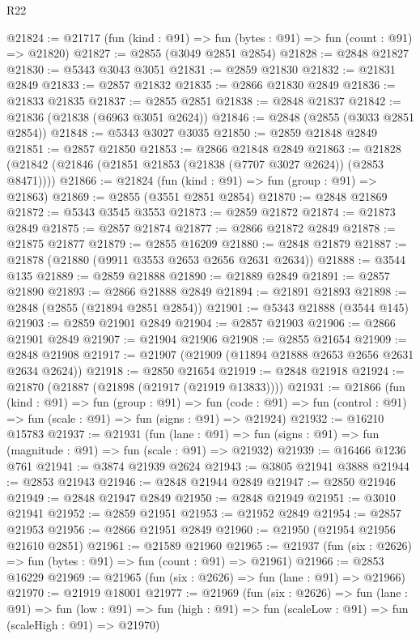 \begin{lexlean}{R22}
\begin{coremodule}
@21824 := @21717 (fun (kind : @91) => fun (bytes : @91) => fun (count : @91) => @21820)
@21827 := @2855 (@3049 @2851 @2854)
@21828 := @2848 @21827
@21830 := @5343 @3043 @3051
@21831 := @2859 @21830
@21832 := @21831 @2849
@21833 := @2857 @21832
@21835 := @2866 @21830 @2849
@21836 := @21833 @21835
@21837 := @2855 @2851
@21838 := @2848 @21837
@21842 := @21836 (@21838 (@6963 @3051 @2624))
@21846 := @2848 (@2855 (@3033 @2851 @2854))
@21848 := @5343 @3027 @3035
@21850 := @2859 @21848 @2849
@21851 := @2857 @21850
@21853 := @2866 @21848 @2849
@21863 := @21828 (@21842 (@21846 (@21851 @21853 (@21838 (@7707 @3027 @2624)) (@2853 @8471))))
@21866 := @21824 (fun (kind : @91) => fun (group : @91) => @21863)
@21869 := @2855 (@3551 @2851 @2854)
@21870 := @2848 @21869
@21872 := @5343 @3545 @3553
@21873 := @2859 @21872
@21874 := @21873 @2849
@21875 := @2857 @21874
@21877 := @2866 @21872 @2849
@21878 := @21875 @21877
@21879 := @2855 @16209
@21880 := @2848 @21879
@21887 := @21878 (@21880 (@9911 @3553 @2653 @2656 @2631 @2634))
@21888 := @3544 @135
@21889 := @2859 @21888
@21890 := @21889 @2849
@21891 := @2857 @21890
@21893 := @2866 @21888 @2849
@21894 := @21891 @21893
@21898 := @2848 (@2855 (@21894 @2851 @2854))
@21901 := @5343 @21888 (@3544 @145)
@21903 := @2859 @21901 @2849
@21904 := @2857 @21903
@21906 := @2866 @21901 @2849
@21907 := @21904 @21906
@21908 := @2855 @21654
@21909 := @2848 @21908
@21917 := @21907 (@21909 (@11894 @21888 @2653 @2656 @2631 @2634 @2624))
@21918 := @2850 @21654
@21919 := @2848 @21918
@21924 := @21870 (@21887 (@21898 (@21917 (@21919 @13833))))
@21931 := @21866
    (fun (kind : @91) =>
    fun (group : @91) =>
    fun (code : @91) => fun (control : @91) => fun (scale : @91) => fun (signs : @91) => @21924)
@21932 := @16210 @15783
@21937 := @21931
    (fun (lane : @91) => fun (signs : @91) => fun (magnitude : @91) => fun (scale : @91) => @21932)
@21939 := @16466 @1236 @761
@21941 := @3874 @21939 @2624
@21943 := @3805 @21941 @3888
@21944 := @2853 @21943
@21946 := @2848 @21944 @2849
@21947 := @2850 @21946
@21949 := @2848 @21947 @2849
@21950 := @2848 @21949
@21951 := @3010 @21941
@21952 := @2859 @21951
@21953 := @21952 @2849
@21954 := @2857 @21953
@21956 := @2866 @21951 @2849
@21960 := @21950 (@21954 @21956 @21610 @2851)
@21961 := @21589 @21960
@21965 := @21937 (fun (six : @2626) => fun (bytes : @91) => fun (count : @91) => @21961)
@21966 := @2853 @16229
@21969 := @21965 (fun (six : @2626) => fun (lane : @91) => @21966)
@21970 := @21919 @18001
@21977 := @21969
    (fun (six : @2626) =>
    fun (lane : @91) =>
    fun (low : @91) => fun (high : @91) => fun (scaleLow : @91) => fun (scaleHigh : @91) => @21970)

\end{coremodule}
\end{lexlean}
